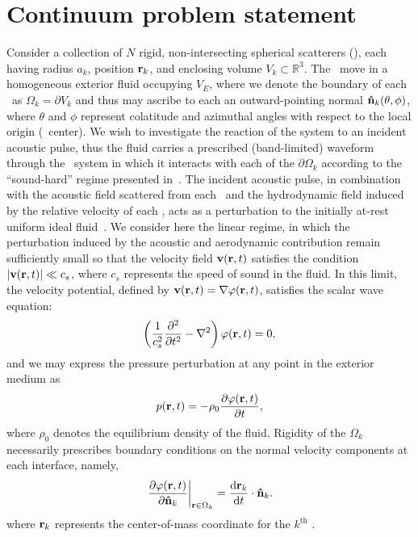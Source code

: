 \section{Continuum problem statement}

Consider a collection of $N$ rigid, non-intersecting spherical scatterers (\bubbles), each having radius $a_k$, position $\vb{r}_k$, and enclosing volume $V_k \subset \mathbb{R}^3$.
The \bubbles\ move in a homogeneous exterior fluid occupying $V_E$, where we denote the boundary of each \bubble\ as $\Omega_k = \partial V_k$ and thus may ascribe  to each an outward-pointing normal $\vu{n}_k\qty(\theta, \phi)$,
where $\theta$ and $\phi$ represent colatitude and azimuthal angles with respect to the local origin (\bubble\ center).
We wish to investigate the reaction of the system to an incident acoustic pulse, thus the fluid carries a prescribed (band-limited) waveform through the \bubble\ system in which it interacts with each of the $\partial \Omega_k$ according to the ``sound-hard'' regime presented in~\cite{Li2014}.
The incident acoustic pulse, in combination with the acoustic field scattered from each \bubble\ and the hydrodynamic field induced by the relative velocity of each \bubble, acts as a perturbation to the initially at-rest uniform ideal fluid~\cite{Myers1992, Landau2013}.
We consider here the linear regime, in which the perturbation induced by the acoustic and aerodynamic contribution remain sufficiently small so that the velocity field $\vb{v}(\vb{r}, t)$ satisfies the condition $\abs{\vb{v}(\vb{r}, t)} \ll c_s $, where $c_s$ represents the speed of sound in the fluid.
In this limit, the velocity potential, defined by $\vb{v}(\vb{r}, t) = \nabla \varphi\qty(\vb{r}, t)$, satisfies the scalar wave equation:
\begin{equation}
    \left(\frac{1}{c_s^2} \frac{\partial^2}{\partial t^2}-\nabla^2\right) \varphi\qty(\vb{r}, t) = 0,
  \label{eq:Helmholtz}
\end{equation}
and we may express the pressure perturbation at any point in the exterior medium as
\begin{equation} \label{eq:Bernoulli}
  p\qty(\vb{r}, t) = - \rho_0\pdv{\varphi\qty(\vb{r}, t)}{t},
\end{equation}
where $\rho_0$ denotes the equilibrium density of the fluid.
Rigidity of the $\Omega_k$ necessarily prescribes boundary conditions on the normal velocity components at each interface, namely,
\begin{equation}
  \left.\pdv{\varphi(\vb{r},t)}{\vu{n}_k}\right|_{\vb{r} \in \Omega_k} = \dv{\vb{r}_k}{t} \cdot \vu{n}_k.
  \label{eq:boundary_conditions}
\end{equation}
where $\vb{r}_k$ represents the center-of-mass coordinate for the $k^\text{th}$ \bubble.

